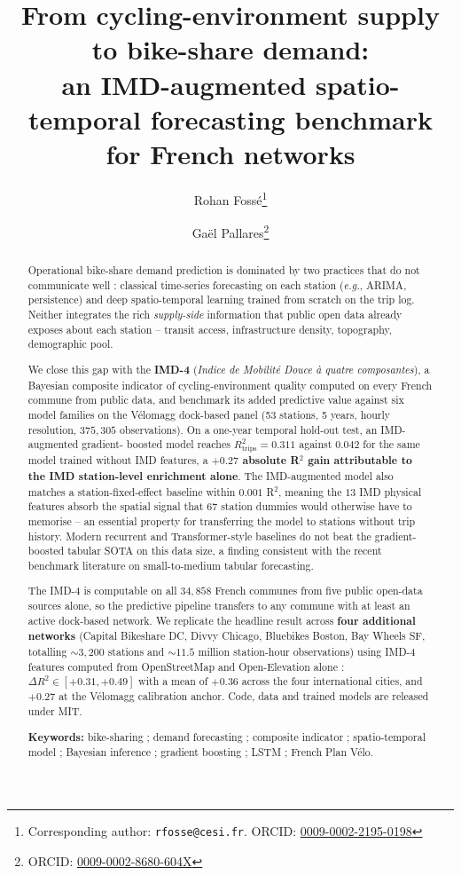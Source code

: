 \documentclass[11pt,a4paper]{article}
\title{\Large\bfseries From cycling-environment supply to bike-share demand:\\
\large an IMD-augmented spatio-temporal forecasting benchmark for
French networks}
\author[1]{Rohan Foss\'e\thanks{Corresponding author: \texttt{rfosse@cesi.fr}. ORCID: \href{https://orcid.org/0009-0002-2195-0198}{0009-0002-2195-0198}}}
\author[2]{Ga\"el Pallares\thanks{ORCID: \href{https://orcid.org/0009-0002-8680-604X}{0009-0002-8680-604X}}}
\affil[1]{CESI Engineering School, Montpellier, France}
\affil[2]{CESI LINEACT (EA 7527), Montpellier, France}
\date{}
\begin{document}
\maketitle

\begin{abstract}
\noindent
Operational bike-share demand prediction is dominated by two
practices that do not communicate well : classical time-series
forecasting on each station (\emph{e.g.}, ARIMA, persistence) and
deep spatio-temporal learning trained from scratch on the trip log.
Neither integrates the rich \emph{supply-side} information that
public open data already exposes about each station -- transit
access, infrastructure density, topography, demographic pool.

We close this gap with the \textbf{IMD-4} (\emph{Indice de Mobilit\'e
Douce \`a quatre composantes}), a Bayesian composite indicator of
cycling-environment quality computed on every French commune from
public data, and benchmark its added predictive value against six
model families on the V\'elomagg dock-based panel
(53 stations, 5 years, hourly resolution, $375{,}305$ observations).
On a one-year temporal hold-out test, an IMD-augmented gradient-
boosted model reaches $R^{2}_{\text{trips}} = 0.311$ against $0.042$
for the same model trained without IMD features, a \textbf{$+0.27$
absolute R$^2$ gain attributable to the IMD station-level
enrichment alone}.  The IMD-augmented model also matches a
station-fixed-effect baseline within $0.001$ R$^2$, meaning the
$13$ IMD physical features absorb the spatial signal that $67$
station dummies would otherwise have to memorise -- an essential
property for transferring the model to stations without trip
history.  Modern recurrent and Transformer-style baselines do not
beat the gradient-boosted tabular SOTA on this data size, a
finding consistent with the recent benchmark literature on
small-to-medium tabular forecasting.

The IMD-4 is computable on all $34{,}858$ French communes from
five public open-data sources alone, so the predictive pipeline
transfers to any commune with at least an active dock-based
network.  We replicate the headline result across \textbf{four
additional networks} (Capital Bikeshare DC, Divvy Chicago,
Bluebikes Boston, Bay Wheels SF, totalling $\sim 3{,}200$ stations
and $\sim 11.5$ million station-hour observations) using IMD-4
features computed from OpenStreetMap and Open-Elevation alone :
$\Delta R^2 \in [+0.31, +0.49]$ with a mean of $+0.36$ across the
four international cities, and $+0.27$ at the V\'elomagg
calibration anchor.  Code, data and trained models are released
under MIT.

\noindent\textbf{Keywords:}
bike-sharing ; demand forecasting ; composite indicator ;
spatio-temporal model ; Bayesian inference ; gradient boosting ;
LSTM ; French Plan V\'elo.
\end{abstract}
\end{document}
